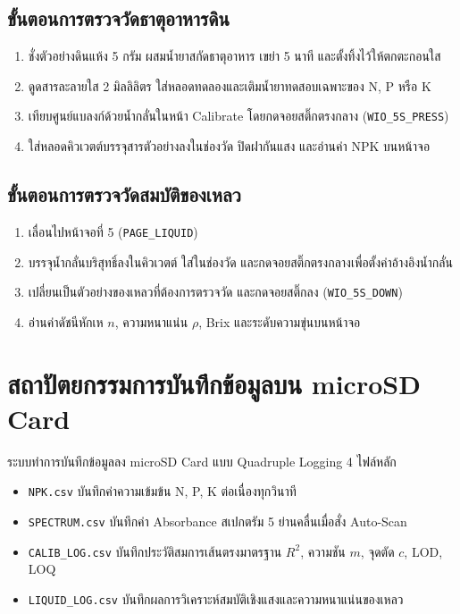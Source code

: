 \subsection{ขั้นตอนการตรวจวัดธาตุอาหารดิน}
\begin{enumerate}[leftmargin=1.5em, itemsep=2pt]
    \item ชั่งตัวอย่างดินแห้ง 5 กรัม ผสมน้ำยาสกัดธาตุอาหาร เขย่า 5 นาที และตั้งทิ้งไว้ให้ตกตะกอนใส
    \item ดูดสารละลายใส 2 มิลลิลิตร ใส่หลอดทดลองและเติมน้ำยาทดสอบเฉพาะของ N, P หรือ K
    \item เทียบศูนย์แบลงก์ด้วยน้ำกลั่นในหน้า Calibrate โดยกดจอยสติ๊กตรงกลาง (\texttt{WIO\_5S\_PRESS})
    \item ใส่หลอดคิวเวตต์บรรจุสารตัวอย่างลงในช่องวัด ปิดฝากันแสง และอ่านค่า NPK บนหน้าจอ
\end{enumerate}

\subsection{ขั้นตอนการตรวจวัดสมบัติของเหลว}
\begin{enumerate}[leftmargin=1.5em, itemsep=2pt]
    \item เลื่อนไปหน้าจอที่ 5 (\texttt{PAGE\_LIQUID})
    \item บรรจุน้ำกลั่นบริสุทธิ์ลงในคิวเวตต์ ใส่ในช่องวัด และกดจอยสติ๊กตรงกลางเพื่อตั้งค่าอ้างอิงน้ำกลั่น
    \item เปลี่ยนเป็นตัวอย่างของเหลวที่ต้องการตรวจวัด และกดจอยสติ๊กลง (\texttt{WIO\_5S\_DOWN})
    \item อ่านค่าดัชนีหักเห $n$, ความหนาแน่น $\rho$, Brix และระดับความขุ่นบนหน้าจอ
\end{enumerate}

\section{สถาปัตยกรรมการบันทึกข้อมูลบน microSD Card}
ระบบทำการบันทึกข้อมูลลง microSD Card แบบ Quadruple Logging 4 ไฟล์หลัก
\begin{itemize}[leftmargin=1.5em, itemsep=2pt]
    \item \texttt{NPK.csv} บันทึกค่าความเข้มข้น N, P, K ต่อเนื่องทุกวินาที
    \item \texttt{SPECTRUM.csv} บันทึกค่า Absorbance สเปกตรัม 5 ย่านคลื่นเมื่อสั่ง Auto-Scan
    \item \texttt{CALIB\_LOG.csv} บันทึกประวัติสมการเส้นตรงมาตรฐาน $R^2$, ความชัน $m$, จุดตัด $c$, LOD, LOQ
    \item \texttt{LIQUID\_LOG.csv} บันทึกผลการวิเคราะห์สมบัติเชิงแสงและความหนาแน่นของเหลว
\end{itemize}


